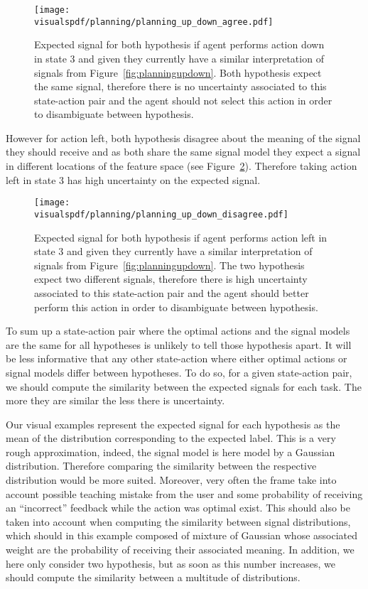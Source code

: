 \begin{figure}[!ht]
  \centering
  \texttt{[image: \\visualspdf/planning/planning\_up\_down\_agree.pdf]}
  \caption{Expected signal for both hypothesis if agent performs action down in state 3 and given they currently have a similar interpretation of signals from Figure~\ref{fig:planningupdown}. Both hypothesis expect the same signal, therefore there is no uncertainty associated to this state-action pair and the agent should not select this action in order to disambiguate between hypothesis.}
  \label{fig:uncertaintysignalupdownagree}
\end{figure}

However for action left, both hypothesis disagree about the meaning of the signal they should receive and as both share the same signal model they expect a signal in different locations of the feature space (see Figure~\ref{fig:uncertaintysignalupdowndisagree}). Therefore taking action left in state 3 has high uncertainty on the expected signal.

\begin{figure}[!ht]
  \centering
  \texttt{[image: \\visualspdf/planning/planning\_up\_down\_disagree.pdf]}
  \caption{Expected signal for both hypothesis if agent performs action left in state 3 and given they currently have a similar interpretation of signals from Figure~\ref{fig:planningupdown}. The two hypothesis expect two different signals, therefore there is high uncertainty associated to this state-action pair and the agent should better perform this action in order to disambiguate between hypothesis.}
  \label{fig:uncertaintysignalupdowndisagree}
\end{figure}


To sum up a state-action pair where the optimal actions and the signal models are the same for all hypotheses is unlikely to tell those hypothesis apart. It will be less informative that any other state-action where either optimal actions or signal models differ between hypotheses. To do so, for a given state-action pair, we should compute the similarity between the expected signals for each task. The more they are similar the less there is uncertainty.

Our visual examples represent the expected signal for each hypothesis as the mean of the distribution corresponding to the expected label. This is a very rough approximation, indeed, the signal model is here model by a Gaussian distribution. Therefore comparing the similarity between the respective distribution would be more suited. Moreover, very often the frame take into account possible teaching mistake from the user and some probability of receiving an ``incorrect'' feedback while the action was optimal exist. This should also be taken into account when computing the similarity between signal distributions, which should in this example composed of mixture of Gaussian whose associated weight are the probability of receiving their associated meaning. In addition, we here only consider two hypothesis, but as soon as this number increases, we should compute the similarity between a multitude of distributions. 


